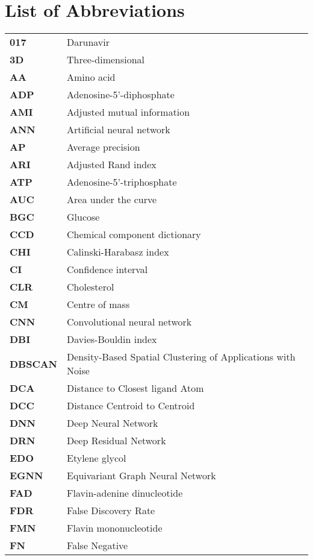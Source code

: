 \chapter*{List of Abbreviations}

\begin{longtable}[l]{@{}p{2.5cm}p{12cm}@{}}
\textbf{017} & Darunavir \\
\textbf{3D} & Three-dimensional \\
\textbf{AA} & Amino acid \\
\textbf{ADP} & Adenosine-5'-diphosphate \\
\textbf{AMI} & Adjusted mutual information \\
\textbf{ANN} & Artificial neural network \\
\textbf{AP} & Average precision \\
\textbf{ARI} & Adjusted Rand index \\
\textbf{ATP} & Adenosine-5’-triphosphate \\
\textbf{AUC} & Area under the curve \\
\textbf{BGC} & Glucose \\
\textbf{CCD} & Chemical component dictionary \\
\textbf{CHI} & Calinski-Harabasz index \\
\textbf{CI} & Confidence interval \\
\textbf{CLR} & Cholesterol \\
\textbf{CM} & Centre of mass \\
\textbf{CNN} & Convolutional neural network \\
\textbf{DBI} & Davies-Bouldin index \\
\textbf{DBSCAN} & Density-Based Spatial Clustering of Applications with Noise \\
\textbf{DCA} & Distance to Closest ligand Atom \\
\textbf{DCC} & Distance Centroid to Centroid \\
\textbf{DNN} & Deep Neural Network \\
\textbf{DRN} & Deep Residual Network \\
\textbf{EDO} & Etylene glycol \\
\textbf{EGNN} & Equivariant Graph Neural Network \\
\textbf{FAD} & Flavin-adenine dinucleotide \\
\textbf{FDR} & False Discovery Rate \\
\textbf{FMN} & Flavin mononucleotide \\
\textbf{FN} & False Negative \\

\end{longtable}
